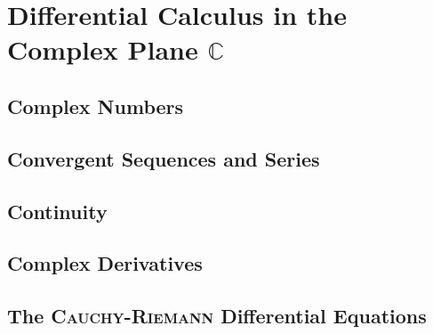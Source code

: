 \chapter{Differential Calculus in the Complex Plane \(\mathbb{C}\)}

\section{Complex Numbers}

\section{Convergent Sequences and Series}

\section{Continuity}

\section{Complex Derivatives}

\section{The \textsc{Cauchy-Riemann} Differential Equations}
